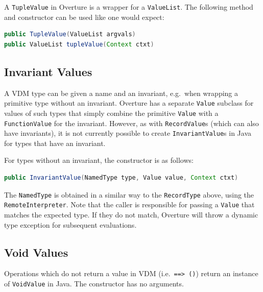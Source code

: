 \documentclass{overturerepchap}
\begin{document}
A \texttt{TupleValue} in Overture is a wrapper for a \texttt{ValueList}. The following method and constructor can be used like one would expect:

\begin{lstlisting}[language=JAVA]
public TupleValue(ValueList argvals)
public ValueList tupleValue(Context ctxt)
\end{lstlisting}

\subsection{Invariant Values}

A VDM type can be given a name and an invariant, e.g.\ when wrapping a primitive type without an invariant. Overture has a separate \texttt{Value} subclass for values of such types that simply combine the primitive \texttt{Value} with a \texttt{FunctionValue} for the invariant. However, as with \texttt{RecordValue}s (which can also have invariants), it is not currently possible to create \texttt{InvariantValue}s in Java for types that have an invariant.

For types without an invariant, the constructor is as follows:

\begin{lstlisting}[language=JAVA]
public InvariantValue(NamedType type, Value value, Context ctxt)
\end{lstlisting}

The \texttt{NamedType} is obtained in a similar way to the \texttt{RecordType} above, using the \texttt{Remote\-Interpreter}. Note that the caller is responsible for passing a \texttt{Value} that matches the expected type. If they do not match, Overture will throw a dynamic type exception for subsequent evaluations.

\subsection{Void Values}

Operations which do not return a value in VDM (i.e.\ \texttt{==> ()}) return an instance of \texttt{VoidValue} in Java. The constructor has no arguments.

\newpage%
\label{sec:index}
\printindex
\end{document}
